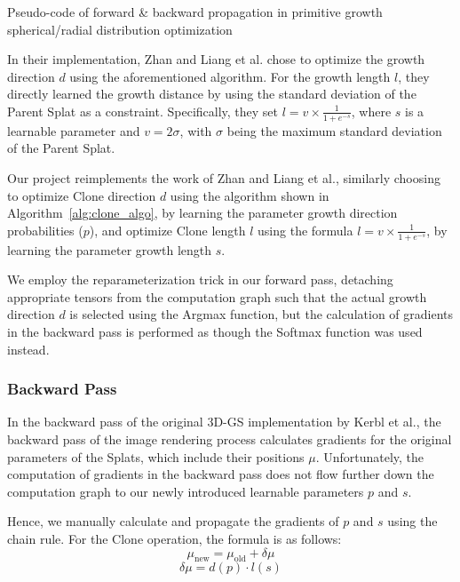 \documentclass[11pt]{report}
\begin{document}
\begin{center} %
    \begin{minipage}{0.70\textwidth}
        \begin{algorithm}[H]
        
        \caption{Pseudo-code of forward \& backward propagation in primitive growth spherical/radial distribution optimization}
        \label{alg:clone_algo}
        \end{algorithm}
    \end{minipage}
\end{center}

In their implementation, Zhan and Liang et al. chose to optimize the growth direction $d$ using the aforementioned algorithm. For the growth length $l$, they directly learned the growth distance by using the standard deviation of the Parent Splat as a constraint. Specifically, they set $l = v \times \frac{1}{1 + e^{-s}}$, where $s$ is a learnable parameter and $v = 2 \sigma$, with $\sigma$ being the maximum standard deviation of the Parent Splat.

Our project reimplements the work of Zhan and Liang et al., similarly choosing to optimize Clone direction $d$ using the algorithm shown in Algorithm~\ref{alg:clone_algo}, by learning the parameter growth direction probabilities ($p$), and optimize Clone length $l$ using the formula $l = v \times \frac{1}{1 + e^{-s}}$, by learning the parameter growth length $s$.

We employ the reparameterization trick in our forward pass, detaching appropriate tensors from the computation graph such that the actual growth direction $d$ is selected using the Argmax function, but the calculation of gradients in the backward pass is performed as though the Softmax function was used instead.

\subsubsection{Backward Pass}
In the backward pass of the original 3D-GS implementation by Kerbl et al., the backward pass of the image rendering process calculates gradients for the original parameters of the Splats, which include their positions $\mu$. Unfortunately, the computation of gradients in the backward pass does not flow further down the computation graph to our newly introduced learnable parameters $p$ and $s$.

Hence, we manually calculate and propagate the gradients of $p$ and $s$ using the chain rule. For the Clone operation, the formula is as follows:
\[ \mu_{\text{new}} = \mu_{\text{old}} + \delta \mu \]
\[ \delta \mu = d(p) \cdot l(s) \]
\end{document}
